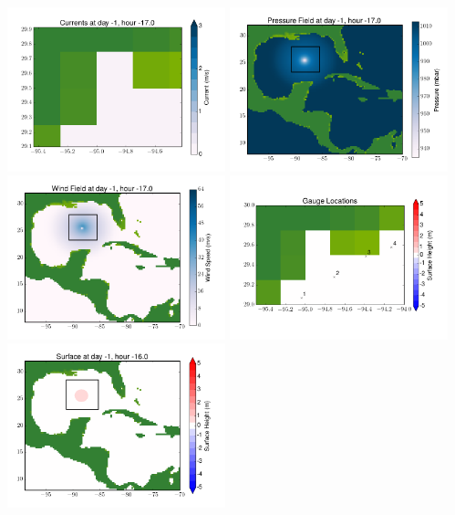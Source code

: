 \documentclass[11pt]{article}
\begin{document}
\vskip 10pt 
\includegraphics[width=0.475\textwidth]{frame0031fig7.png}
\includegraphics[width=0.475\textwidth]{frame0031fig8.png}
\vskip 10pt 
\includegraphics[width=0.475\textwidth]{frame0031fig9.png}
\includegraphics[width=0.475\textwidth]{frame0031fig10.png}
\vskip 10pt 
\includegraphics[width=0.475\textwidth]{frame0032fig1.png}
\end{document}
